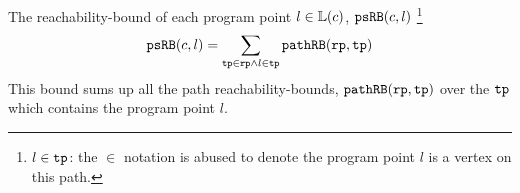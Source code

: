 \begin{enumerate}
    The reachability-bound of each program point $l \in \mathbb{L}(c)$, $\mathtt{psRB}(c, l)$
    \footnote{$l \in \mathtt{tp}$: the $\in$ notation is abused to denote
    the program point $l$ is a vertex on this path.}
   \[ 
     \mathtt{psRB}(c, l) = 
     \sum\limits_{\mathtt{tp} \in \mathtt{rp} \land 
   l \in \mathtt{tp}} 
   \mathtt{pathRB}(\mathtt{rp}, \mathtt{tp})
   \]
   This bound sums up all the path reachability-bounds, $\mathtt{pathRB}(\mathtt{rp}, \mathtt{tp})$ over the $\mathtt{tp}$ which contains the program point $l$.
%
\end{enumerate}